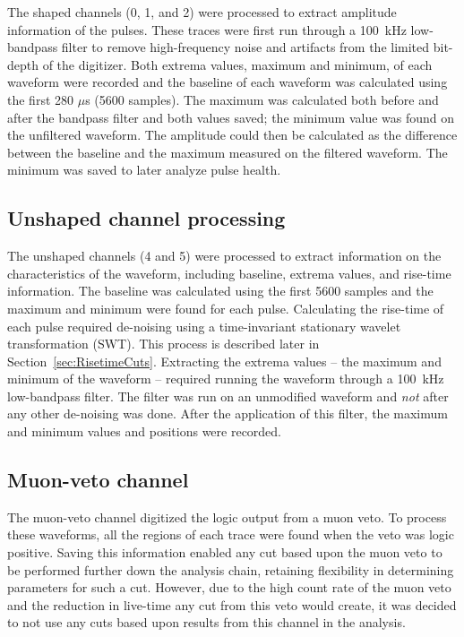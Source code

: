 The shaped channels (0, 1, and 2) were processed to extract amplitude information of the pulses.  These traces were first run through a 100~kHz low-bandpass filter to remove high-frequency noise and artifacts from the limited bit-depth of the digitizer.  Both extrema values, maximum and minimum, of each waveform were recorded and the baseline of each waveform was calculated using the first 280 $\mu$s (5600 samples).  The maximum was calculated both before and after the bandpass filter and both values saved; the minimum value was found on the unfiltered waveform.  The amplitude could then be calculated as the difference between the baseline and the maximum measured on the filtered waveform.  The minimum was saved to later analyze pulse health.

		\subsection{Unshaped channel processing}
		\label{sec:UnshapedWFProc}

The unshaped channels (4 and 5) were processed to extract information on the characteristics of the waveform, including baseline, extrema values, and rise-time information.    The baseline was calculated using the first 5600 samples and the maximum and minimum were found for each pulse.  Calculating the rise-time of each pulse required de-noising using a time-invariant stationary wavelet transformation (SWT).  This process is described later in Section~\ref{sec:RisetimeCuts}.  Extracting the extrema values -- the maximum and minimum of the waveform -- required running the waveform through a 100~kHz low-bandpass filter.  The filter was run on an unmodified waveform and \emph{not} after any other de-noising was done.  After the application of this filter, the maximum and minimum values and positions were recorded.  

		\subsection{Muon-veto channel}
		\label{sec:MuonProc}

The muon-veto channel digitized the logic output from a muon veto.  To process these waveforms, all the regions of each trace were found when the veto was logic positive.  Saving this information enabled any cut based upon the muon veto to be performed further down the analysis chain, retaining flexibility in determining parameters for such a cut.  However, due to the high count rate of the muon veto and the reduction in live-time any cut from this veto would create, it was decided to not use any cuts based upon results from this channel in the analysis.  


